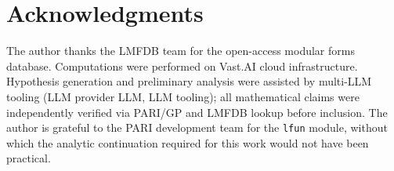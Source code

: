 \documentclass[12pt]{amsart}
\theoremstyle{definition}
\begin{document}
\section*{Acknowledgments}

The author thanks the LMFDB team for the open-access modular forms database.
Computations were performed on Vast.AI cloud infrastructure.
Hypothesis generation and preliminary analysis were assisted by multi-LLM
tooling (LLM provider LLM, LLM tooling); all mathematical claims
were independently verified via PARI/GP and LMFDB lookup before inclusion.
The author is grateful to the PARI development team for the \texttt{lfun}
module, without which the analytic continuation required for this work
would not have been practical.

\end{document}
